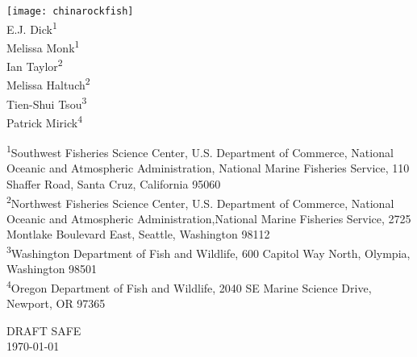 
\begin{center}
\thispagestyle{empty}



\texttt{[image: chinarockfish]}~\\[1cm]



E.J. Dick\textsuperscript{1}\\
Melissa Monk\textsuperscript{1}\\
Ian Taylor\textsuperscript{2}\\
Melissa Haltuch\textsuperscript{2}\\
Tien-Shui Tsou\textsuperscript{3}\\
Patrick Mirick\textsuperscript{4}\\

\vspace{.2cm}

\small
\textsuperscript{1}Southwest Fisheries Science Center, U.S. Department of Commerce, National Oceanic and Atmospheric Administration, National Marine Fisheries Service, 110 Shaffer Road, Santa Cruz, California 95060\\

\textsuperscript{2}Northwest Fisheries Science Center, U.S. Department of Commerce, National Oceanic and Atmospheric Administration,National Marine Fisheries Service, 2725 Montlake Boulevard East, Seattle, Washington 98112\\

\textsuperscript{3}Washington Department of Fish and Wildlife, 600 Capitol Way North, Olympia, Washington 98501\\

\textsuperscript{4}Oregon Department of Fish and Wildlife, 2040 SE Marine Science Drive, Newport, OR 97365\\


\vspace{.2cm}

\vfill
DRAFT SAFE\\

{\large \today}

\maketitle

\setcounter{page}{1}
\end{center}


